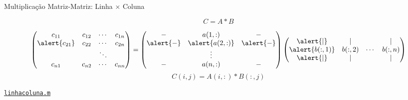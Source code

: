 \documentclass[hyperref={pdfpagelabels=false}]{beamer}
\begin{document}
\begin{frame}{Multiplicação Matriz-Matriz: Linha $\times$ Coluna}
	
  $$C = A*B$$

  \footnotesize{%
    \begin{equation*}
      \begin{pmatrix}
        c_{11} & c_{12} & \cdots & c_{1n} \\
        \alert{c_{21}} & c_{22} & \cdots & c_{2n} \\
        &        & \ddots &        \\
        c_{n1} & c_{n2} & \cdots & c_{nn}
      \end{pmatrix}
      =
      \begin{pmatrix} 
        \relbar & a(1,:) & \relbar\\
        \alert{\relbar} & \alert{a(2,:)} & \alert{\relbar}\\
        & \vdots & \\
        \relbar & a(n,:) & \relbar 
      \end{pmatrix}
      \begin{pmatrix}
        \alert{|} & | & & |\\ 
        \alert{b(:,1)} & b(:,2) & \cdots & b(:,n)\\
        \alert{|} & | & & | 
      \end{pmatrix}
    \end{equation*}
    }
  \vfill
  $$C(i,j) = A(i,:)*B(:,j)$$
  \begin{center} \href{listings/linhacoluna.m}{\underline{\texttt{linhacoluna.m}}} \end{center}
\end{frame}
\end{document}
